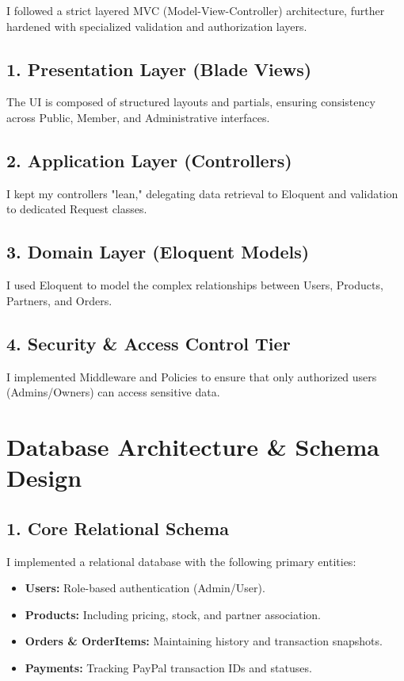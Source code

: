 \documentclass[12pt,a4paper]{article}
\begin{document}
I followed a strict layered MVC (Model-View-Controller) architecture, further hardened with specialized validation and authorization layers.

\subsection{1. Presentation Layer (Blade Views)}
The UI is composed of structured layouts and partials, ensuring consistency across Public, Member, and Administrative interfaces.

\subsection{2. Application Layer (Controllers)}
I kept my controllers "lean," delegating data retrieval to Eloquent and validation to dedicated Request classes.

\subsection{3. Domain Layer (Eloquent Models)}
I used Eloquent to model the complex relationships between Users, Products, Partners, and Orders.

\subsection{4. Security \& Access Control Tier}
I implemented Middleware and Policies to ensure that only authorized users (Admins/Owners) can access sensitive data.

\section{Database Architecture \& Schema Design}

\subsection{1. Core Relational Schema}
I implemented a relational database with the following primary entities:
\begin{itemize}
    \item \textbf{Users:} Role-based authentication (Admin/User).
    \item \textbf{Products:} Including pricing, stock, and partner association.
    \item \textbf{Orders \& OrderItems:} Maintaining history and transaction snapshots.
    \item \textbf{Payments:} Tracking PayPal transaction IDs and statuses.
\end{itemize}
\end{document}
